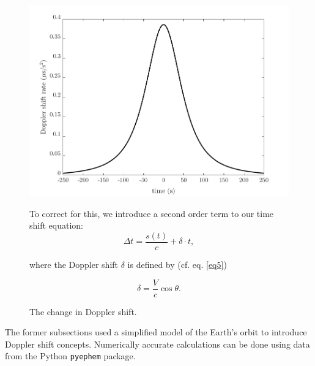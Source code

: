 \begin{figure}[ht!]
	\begin{minipage}{.5\textwidth}
		\centering
		\includegraphics[width=\linewidth]{assets/doppler_shift_rate.png}
		\caption{The change in Doppler shift.}
		\label{fig:doppler_shift_rate}
	\end{minipage}%
	\begin{minipage}{.5\textwidth}
		To correct for this, we introduce a second order term to our time shift equation:
		\begin{equation}
		\Delta t = \frac{s(t)}{c} + \delta \cdot t,
		\end{equation}
		
		where the Doppler shift $\delta$ is defined by (cf. eq. \ref{eq5})
		
		\begin{equation}
		\delta = \frac{V}{c} \cos\theta.
		\end{equation}
	\end{minipage}
\end{figure}

The former subsections used a simplified model of the Earth's orbit to introduce Doppler shift concepts. Numerically accurate calculations can be done using data from the Python \texttt{pyephem} package. 

